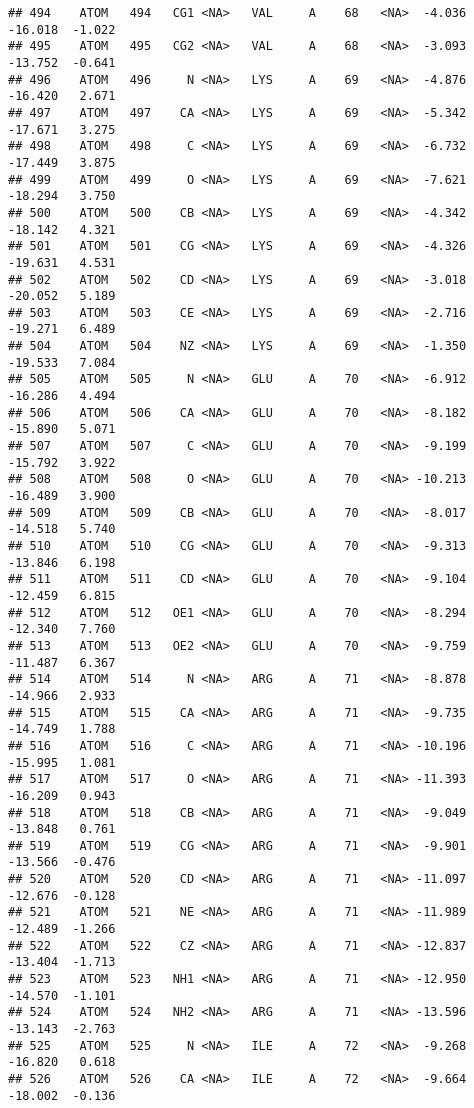 \documentclass[
]{article}
\begin{document}
\begin{verbatim}
## 494    ATOM   494   CG1 <NA>   VAL     A    68   <NA>  -4.036 -16.018  -1.022
## 495    ATOM   495   CG2 <NA>   VAL     A    68   <NA>  -3.093 -13.752  -0.641
## 496    ATOM   496     N <NA>   LYS     A    69   <NA>  -4.876 -16.420   2.671
## 497    ATOM   497    CA <NA>   LYS     A    69   <NA>  -5.342 -17.671   3.275
## 498    ATOM   498     C <NA>   LYS     A    69   <NA>  -6.732 -17.449   3.875
## 499    ATOM   499     O <NA>   LYS     A    69   <NA>  -7.621 -18.294   3.750
## 500    ATOM   500    CB <NA>   LYS     A    69   <NA>  -4.342 -18.142   4.321
## 501    ATOM   501    CG <NA>   LYS     A    69   <NA>  -4.326 -19.631   4.531
## 502    ATOM   502    CD <NA>   LYS     A    69   <NA>  -3.018 -20.052   5.189
## 503    ATOM   503    CE <NA>   LYS     A    69   <NA>  -2.716 -19.271   6.489
## 504    ATOM   504    NZ <NA>   LYS     A    69   <NA>  -1.350 -19.533   7.084
## 505    ATOM   505     N <NA>   GLU     A    70   <NA>  -6.912 -16.286   4.494
## 506    ATOM   506    CA <NA>   GLU     A    70   <NA>  -8.182 -15.890   5.071
## 507    ATOM   507     C <NA>   GLU     A    70   <NA>  -9.199 -15.792   3.922
## 508    ATOM   508     O <NA>   GLU     A    70   <NA> -10.213 -16.489   3.900
## 509    ATOM   509    CB <NA>   GLU     A    70   <NA>  -8.017 -14.518   5.740
## 510    ATOM   510    CG <NA>   GLU     A    70   <NA>  -9.313 -13.846   6.198
## 511    ATOM   511    CD <NA>   GLU     A    70   <NA>  -9.104 -12.459   6.815
## 512    ATOM   512   OE1 <NA>   GLU     A    70   <NA>  -8.294 -12.340   7.760
## 513    ATOM   513   OE2 <NA>   GLU     A    70   <NA>  -9.759 -11.487   6.367
## 514    ATOM   514     N <NA>   ARG     A    71   <NA>  -8.878 -14.966   2.933
## 515    ATOM   515    CA <NA>   ARG     A    71   <NA>  -9.735 -14.749   1.788
## 516    ATOM   516     C <NA>   ARG     A    71   <NA> -10.196 -15.995   1.081
## 517    ATOM   517     O <NA>   ARG     A    71   <NA> -11.393 -16.209   0.943
## 518    ATOM   518    CB <NA>   ARG     A    71   <NA>  -9.049 -13.848   0.761
## 519    ATOM   519    CG <NA>   ARG     A    71   <NA>  -9.901 -13.566  -0.476
## 520    ATOM   520    CD <NA>   ARG     A    71   <NA> -11.097 -12.676  -0.128
## 521    ATOM   521    NE <NA>   ARG     A    71   <NA> -11.989 -12.489  -1.266
## 522    ATOM   522    CZ <NA>   ARG     A    71   <NA> -12.837 -13.404  -1.713
## 523    ATOM   523   NH1 <NA>   ARG     A    71   <NA> -12.950 -14.570  -1.101
## 524    ATOM   524   NH2 <NA>   ARG     A    71   <NA> -13.596 -13.143  -2.763
## 525    ATOM   525     N <NA>   ILE     A    72   <NA>  -9.268 -16.820   0.618
## 526    ATOM   526    CA <NA>   ILE     A    72   <NA>  -9.664 -18.002  -0.136

\end{verbatim}
\end{document}
